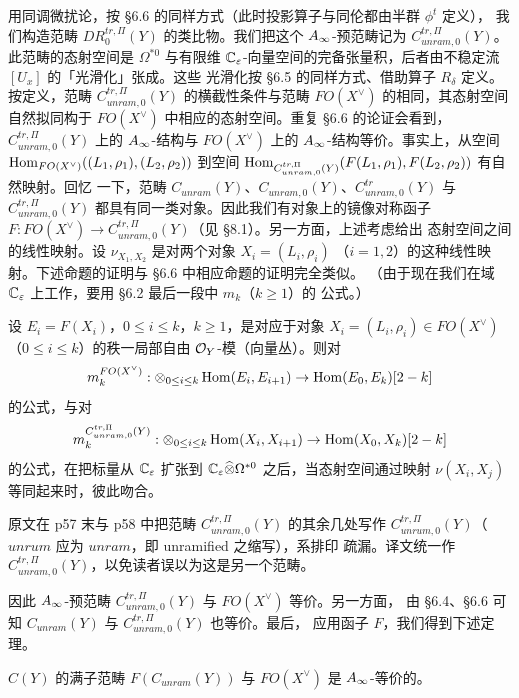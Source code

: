 用同调微扰论，按 §6.6 的同样方式（此时投影算子与同伦都由半群 $\phi^t$ 定义），
我们构造范畴 $DR^{tr,\Pi}_0(Y)$ 的类比物。我们把这个 $A_{\infty}$-预范畴记为
$C^{tr,\Pi}_{unram,0}(Y)$。此范畴的态射空间是 $\Omega^{*0}$ 与有限维
$\mathbb{C}_{\varepsilon}$-向量空间的完备张量积，后者由不稳定流 $[U_x]$ 的「光滑化」张成。这些
光滑化按 §6.5 的同样方式、借助算子 $R_{\delta}$ 定义。按定义，范畴
$C^{tr,\Pi}_{unram,0}(Y)$ 的横截性条件与范畴 $FO(X^{\vee})$ 的相同，其态射空间
自然拟同构于 $FO(X^{\vee})$ 中相应的态射空间。重复 §6.6 的论证会看到，
$C^{tr,\Pi}_{unram,0}(Y)$ 上的 $A_{\infty}$-结构与 $FO(X^{\vee})$ 上的
$A_{\infty}$-结构等价。事实上，从空间
$\operatorname{Hom}_{FO(X^{\vee})}((L_1,\rho_1),(L_2,\rho_2))$ 到空间
$\operatorname{Hom}_{C^{tr,\Pi}_{unram,0}(Y)}(F(L_1,\rho_1),F(L_2,\rho_2))$ 有自然映射。回忆
一下，范畴 $C_{unram}(Y)$、$C_{unram,0}(Y)$、$C^{tr}_{unram,0}(Y)$ 与
$C^{tr,\Pi}_{unram,0}(Y)$ 都具有同一类对象。因此我们有对象上的镜像对称函子
$F:FO(X^{\vee})\to C^{tr,\Pi}_{unram,0}(Y)$（见 §8.1）。另一方面，上述考虑给出
态射空间之间的线性映射。设 $\nu_{X_1,X_2}$ 是对两个对象 $X_i=(L_i,\rho_i)$
（$i=1,2$）的这种线性映射。下述命题的证明与 §6.6 中相应命题的证明完全类似。
（由于现在我们在域 $\mathbb{C}_{\varepsilon}$ 上工作，要用 §6.2 最后一段中 $m_k$（$k\ge1$）的
公式。）

\begin{prp}
设 $E_i=F(X_i)$，$0\le i\le k$，$k\ge1$，是对应于对象
$X_i=(L_i,\rho_i)\in FO(X^{\vee})$（$0\le i\le k$）的秩一局部自由
$\mathcal{O}_Y$-模（向量丛）。则对
\[
  m_k^{FO(X^{\vee})}:\otimes_{0\le i\le k}\operatorname{Hom}(E_i,E_{i+1})
  \to\operatorname{Hom}(E_0,E_k)[2-k]
\]
的公式，与对
\[
  m_k^{C^{tr,\Pi}_{unram,0}(Y)}:\otimes_{0\le i\le k}\operatorname{Hom}(X_i,X_{i+1})
  \to\operatorname{Hom}(X_0,X_k)[2-k]
\]
的公式，在把标量从 $\mathbb{C}_{\varepsilon}$ 扩张到 $\mathbb{C}_{\varepsilon}\widehat{\otimes}\Omega^{*0}$
之后，当态射空间通过映射 $\nu(X_i,X_j)$ 等同起来时，彼此吻合。
\end{prp}

\begin{yizhu}[原文的拼写]
原文在 p57 末与 p58 中把范畴 $C^{tr,\Pi}_{unram,0}(Y)$ 的其余几处写作
$C^{tr,\Pi}_{unrum,0}(Y)$（$unrum$ 应为 $unram$，即 unramified 之缩写），系排印
疏漏。译文统一作 $C^{tr,\Pi}_{unram,0}(Y)$，以免读者误以为这是另一个范畴。
\end{yizhu}

因此 $A_{\infty}$-预范畴 $C^{tr,\Pi}_{unram,0}(Y)$ 与 $FO(X^{\vee})$ 等价。另一方面，
由 §6.4、§6.6 可知 $C_{unram}(Y)$ 与 $C^{tr,\Pi}_{unram,0}(Y)$ 也等价。最后，
应用函子 $F$，我们得到下述定理。

\begin{thm}
$C(Y)$ 的满子范畴 $F(C_{unram}(Y))$ 与 $FO(X^{\vee})$ 是 $A_{\infty}$-等价的。
\end{thm}

